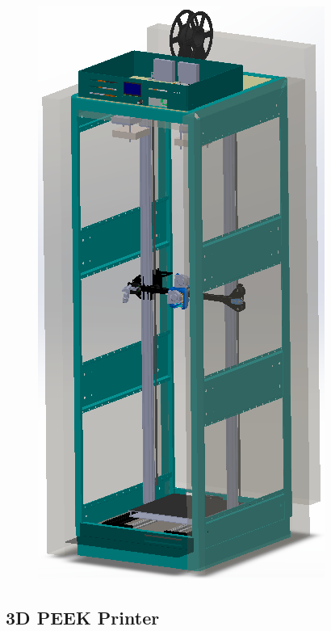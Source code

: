 \documentclass[
	10pt, %
]{FreemanCV}
\begin{document}
\begin{paracol}{2}
\setlength\intextsep{17pt} %
\begin{figure}
    \includegraphics[scale=0.175]{printer2} %
\end{figure}

\leavevmode \subsection{3D PEEK Printer}



\end{paracol}
\end{document}
